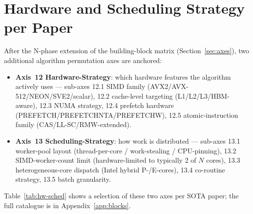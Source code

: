 \section{Hardware and Scheduling Strategy per Paper}\label{sec:hw-sched}

After the N-phase extension of the building-block matrix (Section~\ref{sec:axes}), two
additional algorithm permutation axes are anchored:

\begin{itemize}
  \item \textbf{Axis~12 Hardware-Strategy}: which hardware features the algorithm actively
        uses --- sub-axes 12.1 SIMD family (AVX2/AVX-512/NEON/SVE2/scalar), 12.2
        cache-level targeting (L1/L2/L3/HBM-aware), 12.3 NUMA strategy, 12.4 prefetch
        hardware (PREFETCH/PREFETCHNTA/PREFETCHW), 12.5 atomic-instruction family
        (CAS/LL-SC/RMW-extended).
  \item \textbf{Axis~13 Scheduling-Strategy}: how work is distributed --- sub-axes 13.1
        worker-pool layout (thread-per-core / work-stealing / CPU-pinning), 13.2
        SIMD-worker-count limit (hardware-limited to typically 2 of $N$ cores), 13.3
        heterogeneous-core dispatch (Intel hybrid P-/E-cores), 13.4 co-routine strategy,
        13.5 batch granularity.
\end{itemize}

Table~\ref{tab:hw-sched} shows a selection of these two axes per SOTA paper; the full
catalogue is in Appendix~\ref{app:blocks}.

